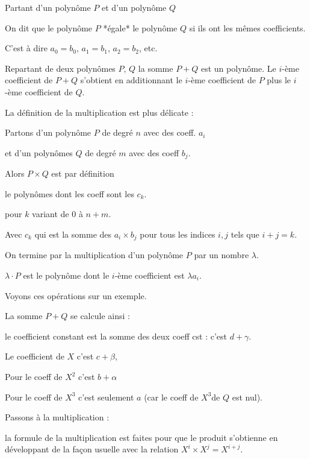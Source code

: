 Partant d'un polynôme $P$ et d'un polynôme $Q$

On dit que le polynôme $P$ *égale* le polynôme $Q$ si
ils ont les mêmes coefficients.

C'est à dire $a_0=b_0$, $a_1=b_1$, $a_2=b_2$, etc.


\change

Repartant de deux polynômes $P$, $Q$ la somme $P+Q$ est un polynôme.
Le $i$-ème coefficient de $P+Q$ s'obtient en additionnant le $i$-ème coefficient de $P$ plus 
le $i$-ème coefficient de $Q$.


\change

La définition de la multiplication est plus délicate :

Partons d'un polynôme $P$ de degré $n$ avec des coeff. $a_i$

et d'un polynômes $Q$ de degré $m$ avec des coeff $b_j$.

Alors  $P \times Q$ est par définition 

le polynômes dont les coeff sont les $c_k$.

pour $k$ variant de $0$ à $n+m$.

Avec $c_k$ qui est la somme des $a_i \times b_j$ pour tous les indices $i,j$ tels que $i+j=k$.

\change

On termine par la multiplication d'un polynôme $P$ par un nombre $\lambda$.

 $\lambda \cdot P$ est le polynôme dont le $i$-ème coefficient
est $\lambda a_i$.

\diapo

Voyons ces opérations sur un exemple.


\change

La somme $P+Q$ se calcule ainsi :

le coefficient constant est la somme des deux coeff cst : c'est $d+ \gamma$.

Le coefficient de $X$  c'est $c+\beta$,

Pour le coeff de $X^2$ c'est $b+\alpha$

Pour le coeff de $X^3$ c'est seulement $a$ (car le coeff de $X^3$de $Q$ est nul).

\change

Passons à la multiplication : 

la formule de la multiplication est faites pour que le produit s'obtienne
en développant de la façon usuelle avec la relation $X^i \times X^j = X^{i+j}$.

